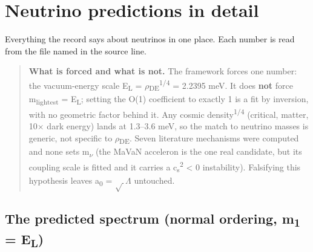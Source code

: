 \documentclass[10pt]{article}
\begin{document}
\section{Neutrino predictions in detail}

Everything the record says about neutrinos in one place. Each number is read from the file named in the source line.


\begin{quote}\small \textbf{What is forced and what is not.} The framework forces one number: the vacuum-energy scale E\textsubscript{L} = \ensuremath{\rho}\textsubscript{DE}\textsuperscript{1/4} = 2.2395 meV. It does \textbf{not} force m\textsubscript{lightest} = E\textsubscript{L}; setting the O(1) coefficient to exactly 1 is a fit by inversion, with no geometric factor behind it. Any cosmic density\textsuperscript{1/4} (critical, matter, 10\ensuremath{\times} dark energy) lands at 1.3--3.6 meV, so the match to neutrino masses is generic, not specific to \ensuremath{\rho}\textsubscript{DE}. Seven literature mechanisms were computed and none sets m\textsubscript{\ensuremath{\nu}} (the MaVaN acceleron is the one real candidate, but its coupling scale is fitted and it carries a c\textsubscript{s}\textsuperscript{2} < 0 instability). Falsifying this hypothesis leaves a\textsubscript{0} = \ensuremath{\sqrt{\,}}\ensuremath{\Lambda} untouched.\end{quote}

\subsection*{The predicted spectrum (normal ordering, m\textsubscript{1} = E\textsubscript{L})}
\end{document}
